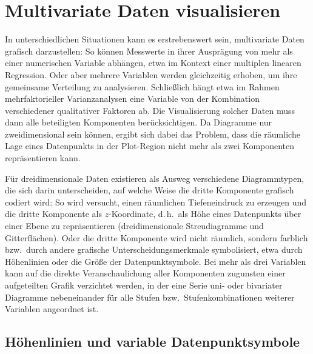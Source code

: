 \section{Multivariate Daten visualisieren}
\label{sec:3dPlot}

In unterschiedlichen Situationen kann es erstrebenswert sein, multivariate Daten grafisch darzustellen: So können Messwerte in ihrer Ausprägung von mehr als einer numerischen Variable abhängen, etwa im Kontext einer multiplen linearen Regression. Oder aber mehrere Variablen werden gleichzeitig erhoben, um ihre gemeinsame Verteilung zu analysieren. Schließlich hängt etwa im Rahmen mehrfaktorieller Varianzanalysen eine Variable von der Kombination verschiedener qualitativer Faktoren ab. Die Visualisierung solcher Daten muss dann alle beteiligten Komponenten berücksichtigen. Da Diagramme nur zweidimensional sein können, ergibt sich dabei das Problem, dass die räumliche Lage eines Datenpunkts in der Plot-Region nicht mehr als zwei Komponenten repräsentieren kann.

Für dreidimensionale Daten existieren als Ausweg verschiedene Diagrammtypen, die sich darin unterscheiden, auf welche Weise die dritte Komponente grafisch codiert wird: So wird versucht, einen räumlichen Tiefeneindruck zu erzeugen und die dritte Komponente als $z$-Koordinate, d.\,h.\ als Höhe eines Datenpunkts über einer Ebene zu repräsentieren (dreidimensionale Streudiagramme und Gitterflächen). Oder die dritte Komponente wird nicht räumlich, sondern farblich bzw.\ durch andere grafische Unterscheidungsmerkmale symbolisiert, etwa durch Höhenlinien oder die Größe der Datenpunktsymbole. Bei mehr als drei Variablen kann auf die direkte Veranschaulichung aller Komponenten zugunsten einer aufgeteilten Grafik verzichtet werden, in der eine Serie uni- oder bivariater Diagramme nebeneinander für alle Stufen bzw.\ Stufenkombinationen weiterer Variablen angeordnet ist.

\subsection{Höhenlinien und variable Datenpunktsymbole}
\label{sec:3dContour}

